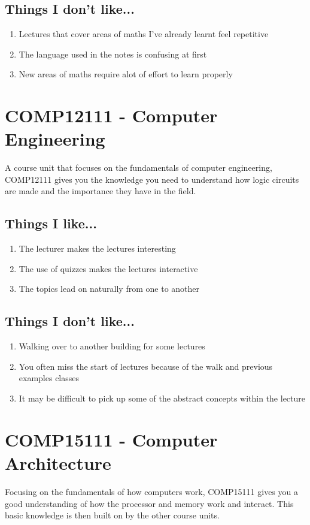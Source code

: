 \documentclass[a4paper]{article}
\begin{document}
\subsection{Things I don't like...}
\begin{enumerate}
\item Lectures that cover areas of maths I've already learnt feel repetitive
\item The language used in the notes is confusing at first
\item New areas of maths require alot of effort to learn properly
\end{enumerate}

\section{COMP12111 - Computer Engineering}
A course unit that focuses on the fundamentals of computer engineering, COMP12111 gives you the knowledge you need to understand how
logic circuits are made and the importance they have in the field.
\subsection{Things I like...}
\begin{enumerate}
\item The lecturer makes the lectures interesting
\item The use of quizzes makes the lectures interactive
\item The topics lead on naturally from one to another
\end{enumerate}
\subsection{Things I don't like...}
\begin{enumerate}
\item Walking over to another building for some lectures
\item You often miss the start of lectures because of the walk and previous examples classes
\item It may be difficult to pick up some of the abstract concepts within the lecture
\end{enumerate}

\section{COMP15111 - Computer Architecture}
Focusing on the fundamentals of how computers work, COMP15111 gives you a good understanding of how the processor and memory work and
interact. This basic knowledge is then built on by the other course units.
\end{document}
